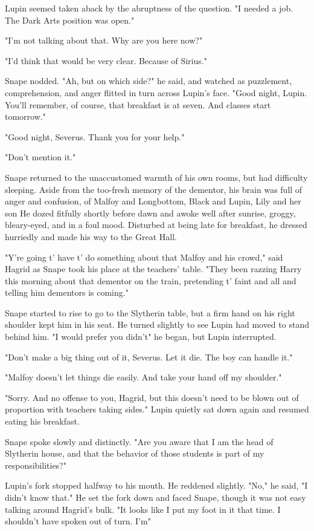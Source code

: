 Lupin seemed taken aback by the abruptness of the question. "I needed a job. The Dark Arts position was open."

"I'm not talking about that. Why are you here now?"

"I'd think that would be very clear. Because of Sirius."

Snape nodded. "Ah, but on which side?" he said, and watched as puzzlement, comprehension, and anger flitted in turn across Lupin's face. "Good night, Lupin. You'll remember, of course, that breakfast is at seven. And classes start tomorrow."

"Good night, Severus. Thank you for your help."

"Don't mention it."

Snape returned to the unaccustomed warmth of his own rooms, but had difficulty sleeping. Aside from the too-fresh memory of the dementor, his brain was full of anger and confusion, of Malfoy and Longbottom, Black and Lupin, Lily and her son{\el} He dozed fitfully shortly before dawn and awoke well after sunrise, groggy, bleary-eyed, and in a foul mood. Disturbed at being late for breakfast, he dressed hurriedly and made his way to the Great Hall.

"Y're going t' have t' do something about that Malfoy and his crowd," said Hagrid as Snape took his place at the teachers' table. "They been razzing Harry this morning about that dementor on the train, pretending t' faint and all and telling him dementors is coming."

Snape started to rise to go to the Slytherin table, but a firm hand on his right shoulder kept him in his seat. He turned slightly to see Lupin had moved to stand behind him. "I would prefer you didn't{\el}" he began, but Lupin interrupted.

"Don't make a big thing out of it, Severus. Let it die. The boy can handle it."

"Malfoy doesn't let things die easily. And take your hand off my shoulder."

"Sorry. And no offense to you, Hagrid, but this doesn't need to be blown out of proportion with teachers taking sides." Lupin quietly sat down again and resumed eating his breakfast.

Snape spoke slowly and distinctly. "Are you aware that I am the head of Slytherin house, and that the behavior of those students is part of my responsibilities?"

Lupin's fork stopped halfway to his mouth. He reddened slightly. "No," he said, "I didn't know that." He set the fork down and faced Snape, though it was not easy talking around Hagrid's bulk. "It looks like I put my foot in it that time. I shouldn't have spoken out of turn. I'm{\el}"

